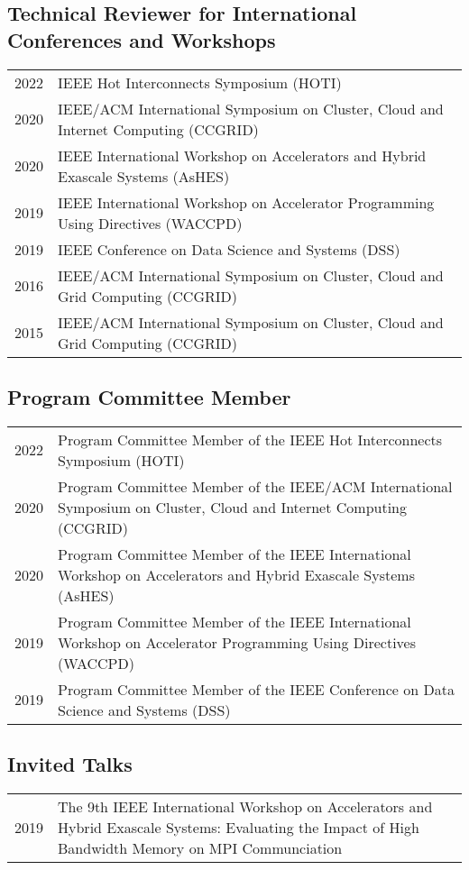 \documentclass[a4paper,10pt]{article}
\begin{document}
\subsection*{Technical Reviewer for International Conferences and Workshops}
\begin{tabular}{rp{11cm}}
    2022 & IEEE Hot Interconnects Symposium (HOTI) \\
    2020 & IEEE/ACM International Symposium on Cluster, Cloud and Internet Computing (CCGRID)\\
    2020 & IEEE International Workshop on Accelerators and Hybrid Exascale Systems (AsHES)\\
    2019 & IEEE International Workshop on Accelerator Programming Using Directives (WACCPD)\\
    2019 & IEEE Conference on Data Science and Systems (DSS)\\
    2016 & IEEE/ACM International Symposium on Cluster, Cloud and Grid Computing (CCGRID)\\
    2015 & IEEE/ACM International Symposium on Cluster, Cloud and Grid Computing (CCGRID)\\
\end{tabular}

\subsection*{Program Committee Member}
\begin{tabular}{rp{11cm}}
    2022 & Program Committee Member of the IEEE Hot Interconnects Symposium (HOTI) \\
    2020 & Program Committee Member of the IEEE/ACM International Symposium on Cluster, Cloud and Internet Computing (CCGRID)\\
    2020 & Program Committee Member of the IEEE International Workshop on Accelerators and Hybrid Exascale Systems (AsHES)\\
    2019 & Program Committee Member of the IEEE International Workshop on Accelerator Programming Using Directives (WACCPD)\\
    2019 & Program Committee Member of the IEEE Conference on Data Science and Systems (DSS)\\
\end{tabular}

\subsection*{Invited Talks}
\begin{tabular}{rp{11cm}}
    2019 & The 9th IEEE International Workshop on Accelerators and Hybrid Exascale Systems: Evaluating the Impact of High Bandwidth Memory on MPI Communciation\\
\end{tabular}
\end{document}
